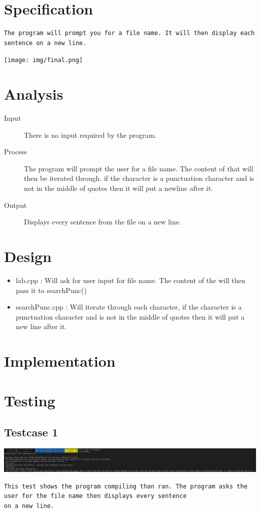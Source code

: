 \documentclass{article}
\begin{document}
\newpage\section*{Specification}
\begin{verbatim}
The program will prompt you for a file name. It will then display each sentence on a new line.
\end{verbatim}
\texttt{[image: img/final.png]}


\newpage\section*{Analysis}
\begin{description}
  \item[Input] There is no input required by the program.
  \item[Process] The program will prompt the user for a file name. The content of that will then be iterated through. if the character is a punctuation character and is not in the middle of quotes then it will put a newline after it.
  \item[Output] Displays every sentence from the file on a new line.
\end{description}

\newpage\section*{Design}
\begin{itemize}
	\item lab.cpp : Will ask for user input for file name. The content of the will then pass it to searchPunc()
	\item searchPunc.cpp : Will iterate through each character, if the character is a punctuation character and is not in the middle of quotes then it will put a new line after it.
\end{itemize}

\newpage\section*{Implementation}

\newpage

\newpage

\newpage

\newpage\section*{Testing}
\subsection*{Testcase 1}
\includegraphics[width=450pt]{img/test1.png}
\begin{verbatim}
This test shows the program compiling than ran. The program asks the user for the file name then displays every sentence
on a new line.
\end{verbatim}
\newpage
\end{document}
